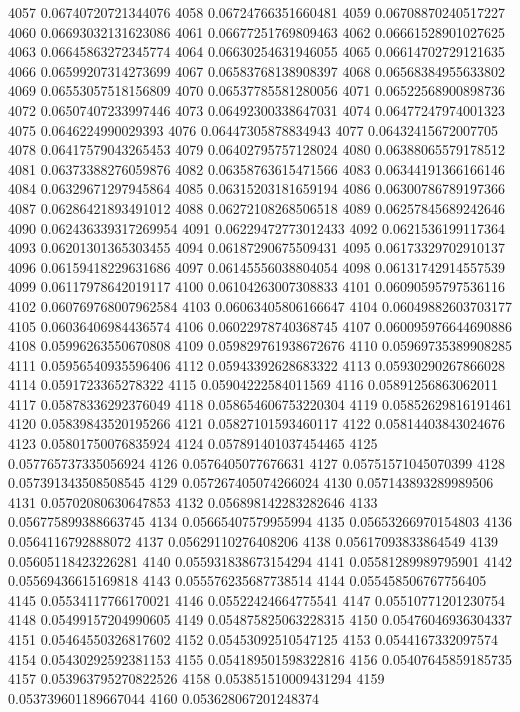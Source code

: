 4057 0.06740720721344076
4058 0.06724766351660481
4059 0.06708870240517227
4060 0.06693032131623086
4061 0.06677251769809463
4062 0.06661528901027625
4063 0.06645863272345774
4064 0.06630254631946055
4065 0.06614702729121635
4066 0.06599207314273699
4067 0.06583768138908397
4068 0.06568384955633802
4069 0.06553057518156809
4070 0.06537785581280056
4071 0.06522568900898736
4072 0.06507407233997446
4073 0.06492300338647031
4074 0.06477247974001323
4075 0.0646224990029393
4076 0.06447305878834943
4077 0.06432415672007705
4078 0.06417579043265453
4079 0.06402795757128024
4080 0.06388065579178512
4081 0.06373388276059876
4082 0.06358763615471566
4083 0.06344191366166146
4084 0.06329671297945864
4085 0.06315203181659194
4086 0.06300786789197366
4087 0.06286421893491012
4088 0.06272108268506518
4089 0.06257845689242646
4090 0.062436339317269954
4091 0.06229472773012433
4092 0.0621536199117364
4093 0.06201301365303455
4094 0.06187290675509431
4095 0.06173329702910137
4096 0.06159418229631686
4097 0.06145556038804054
4098 0.06131742914557539
4099 0.06117978642019117
4100 0.06104263007308833
4101 0.06090595797536116
4102 0.060769768007962584
4103 0.06063405806166647
4104 0.06049882603703177
4105 0.06036406984436574
4106 0.06022978740368745
4107 0.060095976644690886
4108 0.05996263550670808
4109 0.059829761938672676
4110 0.05969735389908285
4111 0.05956540935596406
4112 0.05943392628683322
4113 0.05930290267866028
4114 0.0591723365278322
4115 0.05904222584011569
4116 0.05891256863062011
4117 0.05878336292376049
4118 0.058654606753220304
4119 0.05852629816191461
4120 0.05839843520195266
4121 0.05827101593460117
4122 0.05814403843024676
4123 0.05801750076835924
4124 0.057891401037454465
4125 0.057765737335056924
4126 0.0576405077676631
4127 0.05751571045070399
4128 0.057391343508508545
4129 0.057267405074266024
4130 0.057143893289989506
4131 0.05702080630647853
4132 0.056898142283282646
4133 0.056775899388663745
4134 0.05665407579955994
4135 0.05653266970154803
4136 0.0564116792888072
4137 0.05629110276408206
4138 0.05617093833864549
4139 0.05605118423226281
4140 0.055931838673154294
4141 0.05581289989795901
4142 0.05569436615169818
4143 0.055576235687738514
4144 0.055458506767756405
4145 0.05534117766170021
4146 0.05522424664775541
4147 0.05510771201230754
4148 0.05499157204990605
4149 0.054875825063228315
4150 0.05476046936304337
4151 0.05464550326817602
4152 0.05453092510547125
4153 0.0544167332097574
4154 0.05430292592381153
4155 0.054189501598322816
4156 0.05407645859185735
4157 0.053963795270822526
4158 0.053851510009431294
4159 0.053739601189667044
4160 0.053628067201248374

